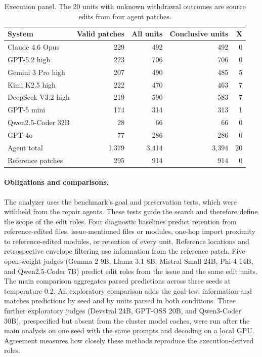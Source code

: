\documentclass[a4paper,fleqn]{cas-sc}
\newcommand{\lab}[1]{\textsf{#1}}
\begin{document}
\begin{table}[pos=htbp]
\caption{Execution panel. The 20 units with unknown withdrawal outcomes are source edits from four agent patches.}
\label{tab:panel}
\centering\small
\begin{tabular}{lrrrr}
\toprule
System & Valid patches & All units & Conclusive units & \lab{X} \\
\midrule
Claude 4.6 Opus & 229 & 492 & 492 & 0 \\
GPT-5.2 high & 223 & 706 & 706 & 0 \\
Gemini 3 Pro high & 207 & 490 & 485 & 5 \\
Kimi K2.5 high & 222 & 470 & 463 & 7 \\
DeepSeek V3.2 high & 219 & 590 & 583 & 7 \\
GPT-5 mini & 174 & 314 & 313 & 1 \\
Qwen2.5-Coder 32B & 28 & 66 & 66 & 0 \\
GPT-4o & 77 & 286 & 286 & 0 \\
\midrule
Agent total & 1,379 & 3,414 & 3,394 & 20 \\
Reference patches & 295 & 914 & 914 & 0 \\
\bottomrule
\end{tabular}
\end{table}

\paragraph{Obligations and comparisons.} The analyzer uses the benchmark's goal and preservation tests, which were withheld from the repair agents. These tests guide the search and therefore define the scope of the edit roles. Four diagnostic baselines predict retention from reference-edited files, issue-mentioned files or modules, one-hop import proximity to reference-edited modules, or retention of every unit. Reference locations and retrospective envelope filtering use information from the reference patch. Five open-weight judges (Gemma 2 9B, Llama 3.1 8B, Mistral Small 24B, Phi-4 14B, and Qwen2.5-Coder 7B) predict edit roles from the issue and the same edit units. The main comparison aggregates parsed predictions across three seeds at temperature 0.2. An exploratory comparison adds the goal-test information and matches predictions by seed and by units parsed in both conditions. Three further exploratory judges (Devstral 24B, GPT-OSS 20B, and Qwen3-Coder 30B), prespecified but absent from the cluster model caches, were run after the main analysis on one seed with the same prompts and decoding on a local GPU. Agreement measures how closely these methods reproduce the execution-derived roles.
\end{document}
